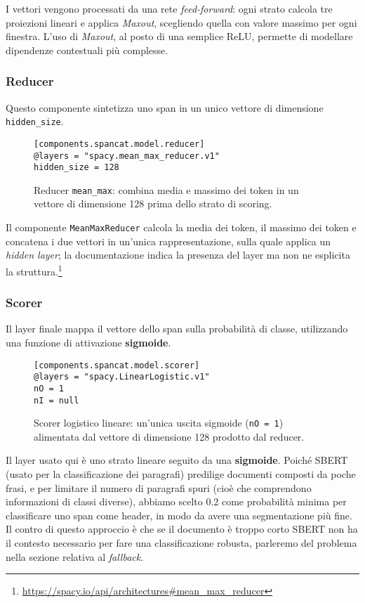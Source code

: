 \noindent I vettori vengono processati da una rete \textit{feed-forward}: ogni strato calcola tre proiezioni lineari e applica \textit{Maxout}, scegliendo quella con valore massimo per ogni finestra. L'uso di \textit{Maxout}, al posto di una semplice ReLU, permette di modellare dipendenze contestuali più complesse.
\subsubsection{Reducer}

\noindent Questo componente sintetizza uno span in un unico vettore di dimensione \texttt{hidden\_size}.

\begin{figure}[H]
    \centering
    \scriptsize
\begin{lstlisting}[style=cmd]
[components.spancat.model.reducer]
@layers = "spacy.mean_max_reducer.v1"
hidden_size = 128
\end{lstlisting}
    \caption{Reducer \texttt{mean\_max}: combina media e massimo dei token in un vettore di dimensione 128 prima dello strato di scoring.}
    \label{fig:cfg-reducer}
\end{figure}

\noindent Il componente \texttt{MeanMaxReducer} calcola la media dei token, il massimo dei token e concatena i due vettori in un'unica rappresentazione, sulla quale applica un \textit{hidden layer}; la documentazione indica la presenza del layer ma non ne esplicita la struttura.\footnote{\url{https://spacy.io/api/architectures\#mean\_max\_reducer}}
\subsubsection{Scorer}

\noindent Il layer finale mappa il vettore dello span sulla probabilità di classe, utilizzando una funzione di attivazione \textbf{sigmoide}.

\begin{figure}[H]
    \centering
    \scriptsize
\begin{lstlisting}[style=cmd]
[components.spancat.model.scorer]
@layers = "spacy.LinearLogistic.v1"
nO = 1
nI = null
\end{lstlisting}
    \caption{Scorer logistico lineare: un'unica uscita sigmoide (\texttt{nO = 1}) alimentata dal vettore di dimensione 128 prodotto dal reducer.}
    \label{fig:cfg-scorer}
\end{figure}
Il layer usato qui è uno strato lineare seguito da una \textbf{sigmoide}.
Poiché SBERT (usato per la classificazione dei paragrafi) predilige documenti composti da poche frasi, e per limitare il numero di paragrafi spuri (cioè che comprendono informazioni di classi diverse), abbiamo scelto 0.2 come probabilità minima per classificare uno span come header, in modo da avere una segmentazione più fine.
Il contro di questo approccio è che se il documento è troppo corto SBERT non ha il contesto necessario per fare una classificazione robusta, parleremo del problema nella sezione relativa al \textit{fallback}.

